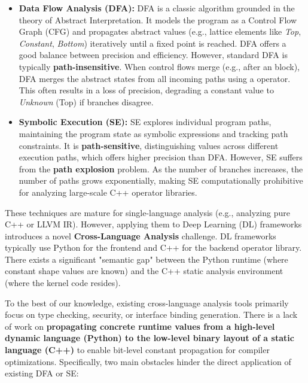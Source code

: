 \begin{itemize}
    \item \textbf{Data Flow Analysis (DFA):} 
    DFA is a classic algorithm grounded in the theory of Abstract Interpretation. It models the program as a Control Flow Graph (CFG) and propagates abstract values (e.g., lattice elements like \textit{Top}, \textit{Constant}, \textit{Bottom}) iteratively until a fixed point is reached. 
    DFA offers a good balance between precision and efficiency. 
    However, standard DFA is typically \textbf{path-insensitive}. When control flows merge (e.g., after an  block), DFA merges the abstract states from all incoming paths using a  operator. This often results in a loss of precision, degrading a constant value to \textit{Unknown} (Top) if branches disagree.

    \item \textbf{Symbolic Execution (SE):} 
    SE explores individual program paths, maintaining the program state as symbolic expressions and tracking path constraints. 
    It is \textbf{path-sensitive}, distinguishing values across different execution paths, which offers higher precision than DFA. 
    However, SE suffers from the \textbf{path explosion} problem. As the number of branches increases, the number of paths grows exponentially, making SE computationally prohibitive for analyzing large-scale C++ operator libraries.
\end{itemize}

These techniques are mature for single-language analysis (e.g., analyzing pure C++ or LLVM IR). However, applying them to Deep Learning (DL) frameworks introduces a novel \textbf{Cross-Language Analysis} challenge. 
DL frameworks typically use Python for the frontend and C++ for the backend operator library. 
There exists a significant "semantic gap" between the Python runtime (where constant shape values are known) and the C++ static analysis environment (where the kernel code resides).

To the best of our knowledge, existing cross-language analysis tools primarily focus on type checking, security, or interface binding generation. 
There is a lack of work on \textbf{propagating concrete runtime values from a high-level dynamic language (Python) to the low-level binary layout of a static language (C++)} to enable bit-level constant propagation for compiler optimizations.
Specifically, two main obstacles hinder the direct application of existing DFA or SE:

